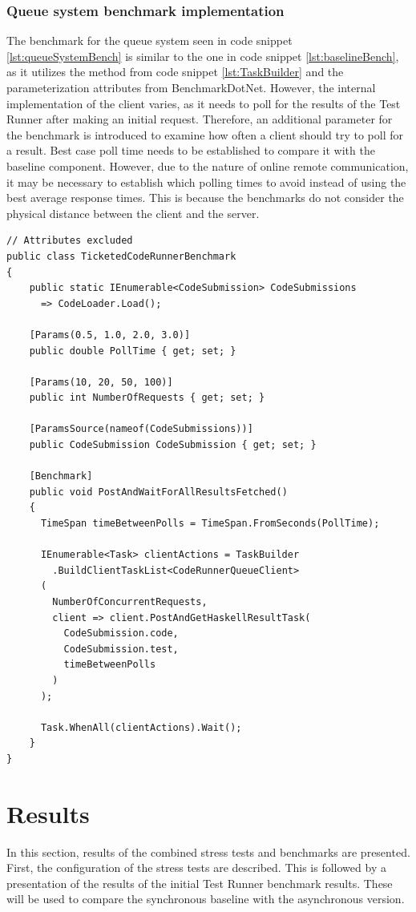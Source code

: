 \subsubsection{Queue system benchmark implementation}
The benchmark for the queue system seen in code snippet \ref{lst:queueSystemBench} is similar to the one in code snippet \ref{lst:baselineBench}, as it utilizes the method from code snippet \ref{lst:TaskBuilder} and the parameterization attributes from BenchmarkDotNet.
However, the internal implementation of the client varies, as it needs to poll for the results of the Test Runner after making an initial request.
Therefore, an additional parameter for the benchmark is introduced to examine how often a client should try to poll for a result.
Best case poll time needs to be established to compare it with the baseline component.
However, due to the nature of online remote communication, it may be necessary to establish which polling times to avoid instead of using the best average response times.
This is because the benchmarks do not consider the physical distance between the client and the server.
\begin{lstlisting}[language=CSharp, escapechar=~, caption={C\# code showing the benchmark implementation for the asynchronous backend}, label={lst:queueSystemBench}]
// Attributes excluded
public class TicketedCodeRunnerBenchmark
{
    public static IEnumerable<CodeSubmission> CodeSubmissions
      => CodeLoader.Load();

    [Params(0.5, 1.0, 2.0, 3.0)]
    public double PollTime { get; set; }

    [Params(10, 20, 50, 100)]
    public int NumberOfRequests { get; set; }

    [ParamsSource(nameof(CodeSubmissions))]
    public CodeSubmission CodeSubmission { get; set; }

    [Benchmark]
    public void PostAndWaitForAllResultsFetched()
    {
      TimeSpan timeBetweenPolls = TimeSpan.FromSeconds(PollTime);

      IEnumerable<Task> clientActions = TaskBuilder
        .BuildClientTaskList<CodeRunnerQueueClient>
      (
        NumberOfConcurrentRequests,
        client => client.PostAndGetHaskellResultTask(
          CodeSubmission.code,
          CodeSubmission.test,
          timeBetweenPolls
        )
      );

      Task.WhenAll(clientActions).Wait();
    }
}
\end{lstlisting}

\section{Results}
In this section, results of the combined stress tests and benchmarks are presented.
First, the configuration of the stress tests are described.
This is followed by a presentation of the results of the initial Test Runner benchmark results.
These will be used to compare the synchronous baseline with the asynchronous version.

